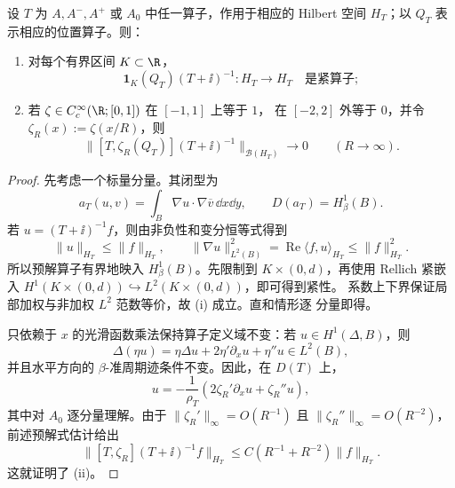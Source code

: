\begin{lemma}[局部紧性与截断交换子]
\label{lem:appendix-local-compactness}
设 $T$ 为 $A,A^-,A^+$ 或 $A_0$ 中任一算子，作用于相应的 Hilbert 空间
$H_T$；以 $Q_T$ 表示相应的位置算子。则：
\begin{enumerate}[label=\textup{(\roman*)},leftmargin=*]
  \item 对每个有界区间 $K\subset\R$，
  \[
    \mathbf 1_K(Q_T)(T+\ii)^{-1}:H_T\longrightarrow H_T
    \quad\text{是紧算子};
  \]
  \item 若 $\zeta\in C_c^\infty(\R;[0,1])$ 在 $[-1,1]$ 上等于 $1$，
  在 $[-2,2]$ 外等于 $0$，并令
  $\zeta_R(x):=\zeta(x/R)$，则
  \begin{equation}
    \bigl\|[T,\zeta_R(Q_T)](T+\ii)^{-1}\bigr\|_{\mathcal B(H_T)}
    \longrightarrow0
    \qquad(R\to\infty).
    \label{eq:appendix-commutator-limit}
  \end{equation}
\end{enumerate}
\end{lemma}
\begin{proof}
先考虑一个标量分量。其闭型为
\[
  a_T(u,v)=\int_B\nabla u\cdot\nabla\overline v\,\dd x\dd y,
  \qquad D(a_T)=H^1_\beta(B).
\]
若 $u=(T+\ii)^{-1}f$，则由非负性和变分恒等式得到
\[
  \|u\|_{H_T}\leq\|f\|_{H_T},
  \qquad
  \|\nabla u\|_{L^2(B)}^2
  =\operatorname{Re}\langle f,u\rangle_{H_T}
  \leq\|f\|_{H_T}^2.
\]
所以预解算子有界地映入 $H^1_\beta(B)$。先限制到
$K\times(0,d)$，再使用 Rellich 紧嵌入
$H^1(K\times(0,d))\hookrightarrow L^2(K\times(0,d))$，即可得到紧性。
系数上下界保证局部加权与非加权 $L^2$ 范数等价，故 (i) 成立。直和情形逐
分量即得。

只依赖于 $x$ 的光滑函数乘法保持算子定义域不变：若
$u\in H^1(\Delta,B)$，则
\[
  \Delta(\eta u)=\eta\Delta u+2\eta'\partial_xu+\eta''u\in L^2(B),
\]
并且水平方向的 $\beta$-准周期迹条件不变。因此，在 $D(T)$ 上，
\begin{equation}
  [T,\zeta_R]u
  =-\frac1{\rho_T}
    \left(2\zeta_R'\partial_xu+\zeta_R''u\right),
  \label{eq:appendix-commutator-formula}
\end{equation}
其中对 $A_0$ 逐分量理解。由于
$\|\zeta_R'\|_\infty=O(R^{-1})$ 且
$\|\zeta_R''\|_\infty=O(R^{-2})$，前述预解式估计给出
\[
  \bigl\|[T,\zeta_R](T+\ii)^{-1}f\bigr\|_{H_T}
  \leq C\left(R^{-1}+R^{-2}\right)\|f\|_{H_T}.
\]
这就证明了 (ii)。
\end{proof}

